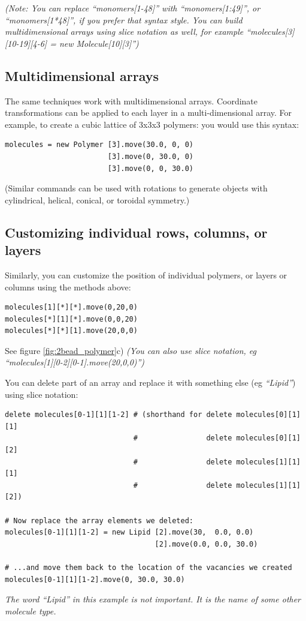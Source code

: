 \documentclass[11pt]{article}
\begin{document}
\textit{(Note: You can replace ``monomers[1-48]'' with
``monomers[1:49]'', or ``monomers[1*48]'', if you prefer that syntax style.
You can build multidimensional arrays using slice notation as well, for example
``molecules[3][10-19][4-6] = new Molecule[10][3]'')}



\subsection{Multidimensional arrays}
\label{sec:multidimensional_arrays}
The same techniques work with multidimensional arrays.
Coordinate transformations can be applied to each layer
in a multi-dimensional array.
For example, to create a cubic lattice of 3x3x3 polymers:
you would use this syntax:
\begin{verbatim}
molecules = new Polymer [3].move(30.0, 0, 0)
                        [3].move(0, 30.0, 0)
                        [3].move(0, 0, 30.0)
\end{verbatim}
(Similar commands can be used with rotations to generate objects
with cylindrical, helical, conical, or toroidal symmetry.)

\subsection{Customizing individual rows, columns, or layers}
Similarly, you can customize the position of individual polymers, 
or layers or columns using the methods above:
\begin{verbatim}
molecules[1][*][*].move(0,20,0)
molecules[*][1][*].move(0,0,20)
molecules[*][*][1].move(20,0,0)
\end{verbatim}
See figure \ref{fig:2bead_polymer}c)
\textit{(You can also use slice notation, 
         eg ``molecules[1][0-2][0-1].move(20,0,0)'')}

You can delete part of an array and replace it with something else
(eg \textit{``Lipid''})
using slice notation:
\begin{verbatim}
delete molecules[0-1][1][1-2] # (shorthand for delete molecules[0][1][1]
                              #                delete molecules[0][1][2]
                              #                delete molecules[1][1][1]
                              #                delete molecules[1][1][2])

# Now replace the array elements we deleted:
molecules[0-1][1][1-2] = new Lipid [2].move(30,  0.0, 0.0)
                                   [2].move(0.0, 0.0, 30.0)

# ...and move them back to the location of the vacancies we created
molecules[0-1][1][1-2].move(0, 30.0, 30.0)
\end{verbatim}
\textit{The word ``Lipid'' in this example is not important.
        It is the name of some other molecule type.}
\end{document}
